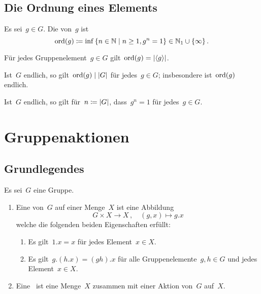 \subsection{Die Ordnung eines Elements}

\begin{definition}
  Es sei~$g \in G$.
  Die  von~$g$ ist
  \[
    \ord(g)
    \defined
    \inf
    {}
    \{
      n \in \Natural
    \suchthat
      n \geq 1,
      g^n = 1
    \}
    \in
    \Natural_1 \cup \{ \infty \} \,.
  \]
\end{definition}

\begin{proposition}
  Für jedes Gruppenelement~$g \in G$ gilt~$\operatorname{ord}(g) = \lvert\langle g\rangle\rvert$.
\end{proposition}

\begin{corollary}
  Ist~$G$ endlich, so gilt~$\operatorname{ord}(g) \mid \lvert G\rvert$ für jedes~$g \in G$;
  insbesondere ist~$\operatorname{ord}(g)$ endlich.
\end{corollary}

\begin{corollary}
  Ist~$G$ endlich, so gilt für~$n \coloneqq \lvert G\rvert$, dass~$g^n = 1$ für jedes~$g \in G$.
\end{corollary}





\section{Gruppenaktionen}



\subsection{Grundlegendes}

\begin{definition}
  Es sei~$G$ eine Gruppe.
  \begin{enumerate}
    \item
      Eine  von~$G$ auf einer Menge~$X$  ist eine Abbildung
      \[
        G \times X \to X \,,
        \quad
        (g,x)
        \mapsto
        g.x
      \]
      welche die folgenden beiden Eigenschaften erfüllt:
      \begin{enumerate}
        \item
          Es gilt~$1.x = x$ für jedes Element~$x \in X$.
        \item
          Es gilt~$g.(h.x) = (gh).x$ für alle Gruppenelemente~$g, h \in G$ und jedes Element~$x \in X$. 
      \end{enumerate}
    \item
      Eine~ ist eine Menge~$X$ zusammen mit einer Aktion von~$G$ auf~$X$.
  \end{enumerate}
\end{definition}

